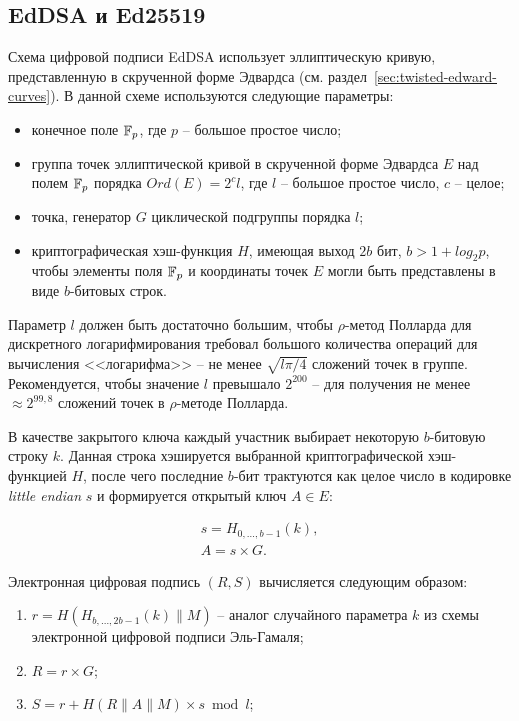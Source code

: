 \subsection{EdDSA и Ed25519}\label{sec:EdDSA}\label{sec:Ed25519}

Схема цифровой подписи EdDSA использует эллиптическую кривую, представленную в скрученной форме Эдвардса (см. раздел~\ref{sec:twisted-edward-curves}). В данной схеме используются следующие параметры:

\begin{itemize}
	\item конечное поле $\mathbb{F}_{p}$, где $p$ -- большое простое число;
	\item группа точек эллиптической кривой в скрученной форме Эдвардса $E$ над полем $\mathbb{F}_{p}$ порядка $Ord(E) = 2^c l$, где $l$ -- большое простое число, $c$ -- целое;
	\item точка, генератор $G$ циклической подгруппы порядка $l$;
	\item криптографическая хэш-функция $H$, имеющая выход $2b$ бит, $b > 1 + log_2 p$, чтобы элементы поля $\mathbb{F}_{p}$ и координаты точек $E$ могли быть представлены в виде $b$-битовых строк.
\end{itemize}

Параметр $l$ должен быть достаточно большим, чтобы $\rho$-метод Полларда для дискретного логарифмирования требовал большого количества операций для вычисления <<логарифма>> -- не менее $\sqrt{l \pi / 4}$ сложений точек в группе. Рекомендуется, чтобы значение $l$ превышало $2^{200}$ -- для получения не менее $\approx 2^{99{,}8}$ сложений точек в $\rho$-методе Полларда.

В качестве закрытого ключа каждый участник выбирает некоторую $b$-битовую строку $k$. Данная строка хэшируется выбранной криптографической хэш-функцией $H$, после чего последние $b$-бит трактуются как целое число в кодировке \foreignlanguage{english}{\textit{little endian}} $s$ и формируется открытый ключ $A \in E$:

\[ \begin{array}{l}
	s = H_{0, \dots, b-1}(k),\\
	A = s \times G.
\end{array} \]

Электронная цифровая подпись $(R, S)$ вычисляется следующим образом:

\begin{enumerate}
	\item $r = H( H_{b,\dots,2b-1}(k) \| M )$ -- аналог случайного параметра $k$ из схемы электронной цифровой подписи Эль-Гамаля;
	\item $R = r \times G$;
	\item $S = r + H( R \| A \| M ) \times s \bmod l$;
\end{enumerate}

